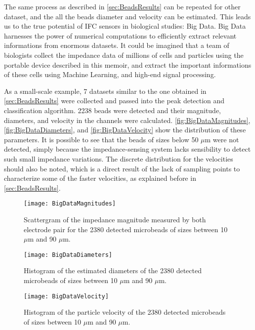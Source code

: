 The same process as described in \autoref{sec:BeadsResults} can be repeated for other dataset, and the all the beads diameter and velocity can be estimated. This leads us to the true potential of IFC sensors in biological studies: Big Data. Big Data harnesses the power of numerical computations to efficiently extract relevant informations from enormous datasets. It could be imagined that a team of biologists collect the impedance data of millions of cells and particles using the portable device described in this memoir, and extract the important informations of these cells using Machine Learning, and high-end signal processing. \par

As a small-scale example, 7 datasets similar to the one obtained in \autoref{sec:BeadsResults} were collected and passed into the peak detection and classification algorithm. 2238 beads were detected and their magnitude, diameters, and velocity in the channels were calculated. \autoref{fig:BigDataMagnitudes}, \autoref{fig:BigDataDiameters}, and \autoref{fig:BigDataVelocity} show the distribution of these parameters. It is possible to see that the beads of sizes below 50 $\mu$m were not detected, simply because the impedance-sensing system lacks sensibility to detect such small impedance variations. The discrete distribution for the velocities should also be noted, which is a direct result of the lack of sampling points to characterize some of the faster velocities, as explained before in \autoref{sec:BeadsResults}. 
\begin{figure}[h]
\centering
\texttt{[image: BigDataMagnitudes]}
\caption{Scattergram of the impedance magnitude measured by both electrode pair for the 2380 detected microbeads of sizes between 10 $\mu$m and 90 $\mu$m.}
\label{fig:BigDataMagnitudes}
\end{figure}

\begin{figure}[h]
\centering
\texttt{[image: BigDataDiameters]}
\caption{Histogram of the estimated diameters of the 2380 detected microbeads of sizes between 10 $\mu$m and 90 $\mu$m.}
\label{fig:BigDataDiameters}
\end{figure}

\begin{figure}[h]
\centering
\texttt{[image: BigDataVelocity]}
\caption{Histogram of the particle velocity of the 2380 detected microbeads of sizes between 10 $\mu$m and 90 $\mu$m.}
\label{fig:BigDataVelocity}
\end{figure}